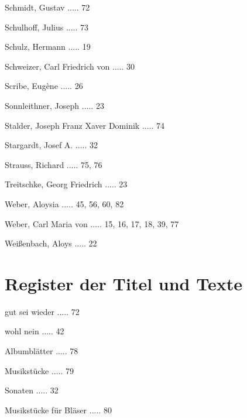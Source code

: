 \documentclass[a4paper, twocolumn, 11pt]{book}
\begin{document}
\newline 
Schmidt, Gustav ..... 72

\newline 
Schulhoff, Julius ..... 73

\newline 
Schulz, Hermann ..... 19

\newline 
Schweizer, Carl Friedrich von ..... 30

\newline 
Scribe, Eugène ..... 26

\newline 
Sonnleithner, Joseph ..... 23

\newline 
Stalder, Joseph Franz Xaver Dominik ..... 74

\newline 
Stargardt, Josef A. ..... 32

\newline 
Strauss, Richard ..... 75, 76

\newline 
Treitschke, Georg Friedrich ..... 23

\newline 
Weber, Aloysia ..... 45, 56, 60, 82

\newline 
Weber, Carl Maria von ..... 15, 16, 17, 18, 39, 77

\newline 
Weißenbach, Aloys ..... 22
    \clearpage  
    \chapter*{\centering Register der Titel und Texte}
\fancyhead{}


\newline 
[...] gut sei wieder ..... 72

\newline 
[...] wohl nein ..... 42

 Albumblätter ..... 78

 Musikstücke ..... 79

 Sonaten ..... 32

 Musikstücke für Bläser ..... 80
\end{document}
